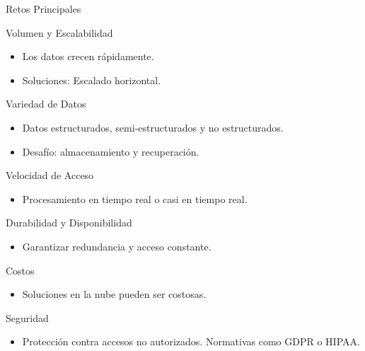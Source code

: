 \documentclass[presentation]{beamer}
\begin{document}
\begin{frame}[label={sec:orgcb09d12}]{Retos Principales}
\begin{block}{Volumen y Escalabilidad}
\begin{itemize}
\item Los datos crecen rápidamente.
\item Soluciones: Escalado horizontal.
\end{itemize}
\end{block}

\begin{block}{Variedad de Datos}
\begin{itemize}
\item Datos estructurados, semi-estructurados y no estructurados.
\item Desafío: almacenamiento y recuperación.
\end{itemize}
\end{block}

\begin{block}{Velocidad de Acceso}
\begin{itemize}
\item Procesamiento en tiempo real o casi en tiempo real.
\end{itemize}
\end{block}

\begin{block}{Durabilidad y Disponibilidad}
\begin{itemize}
\item Garantizar redundancia y acceso constante.
\end{itemize}
\end{block}

\begin{block}{Costos}
\begin{itemize}
\item Soluciones en la nube pueden ser costosas.
\end{itemize}
\end{block}

\begin{block}{Seguridad}
\begin{itemize}
\item Protección contra accesos no autorizados. Normativas como GDPR o HIPAA.
\end{itemize}
\end{block}
\end{frame}
\end{document}
